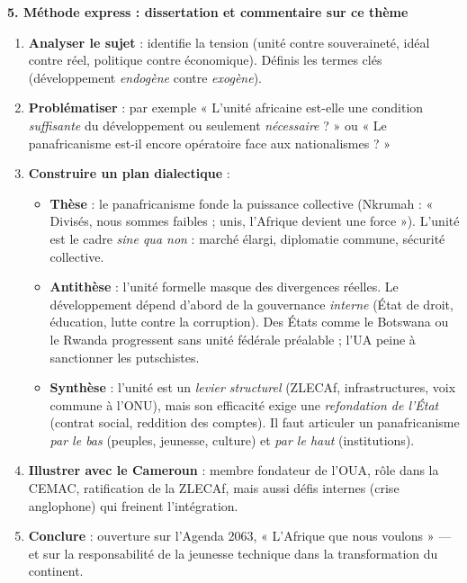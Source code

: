 \documentclass[11pt]{article}
\begin{document}
\textbf{5. Méthode express : dissertation et commentaire sur ce thème}
\begin{methode}
\begin{enumerate}
  \item \textbf{Analyser le sujet} : identifie la tension (unité contre souveraineté, idéal contre réel, politique contre économique). Définis les termes clés (développement \emph{endogène} contre \emph{exogène}).
  \item \textbf{Problématiser} : par exemple « L'unité africaine est-elle une condition \emph{suffisante} du développement ou seulement \emph{nécessaire} ? » ou « Le panafricanisme est-il encore opératoire face aux nationalismes ? »
  \item \textbf{Construire un plan dialectique} :
    \begin{itemize}
      \item \textbf{Thèse} : le panafricanisme fonde la puissance collective (Nkrumah : « Divisés, nous sommes faibles ; unis, l'Afrique devient une force »). L'unité est le cadre \emph{sine qua non} : marché élargi, diplomatie commune, sécurité collective.
      \item \textbf{Antithèse} : l'unité formelle masque des divergences réelles. Le développement dépend d'abord de la gouvernance \emph{interne} (État de droit, éducation, lutte contre la corruption). Des États comme le Botswana ou le Rwanda progressent sans unité fédérale préalable ; l'UA peine à sanctionner les putschistes.
      \item \textbf{Synthèse} : l'unité est un \emph{levier structurel} (ZLECAf, infrastructures, voix commune à l'ONU), mais son efficacité exige une \emph{refondation de l'État} (contrat social, reddition des comptes). Il faut articuler un panafricanisme \emph{par le bas} (peuples, jeunesse, culture) et \emph{par le haut} (institutions).
    \end{itemize}
  \item \textbf{Illustrer avec le Cameroun} : membre fondateur de l'OUA, rôle dans la CEMAC, ratification de la ZLECAf, mais aussi défis internes (crise anglophone) qui freinent l'intégration.
  \item \textbf{Conclure} : ouverture sur l'Agenda 2063, « L'Afrique que nous voulons » — et sur la responsabilité de la jeunesse technique dans la transformation du continent.
\end{enumerate}
\end{methode}
\end{document}
